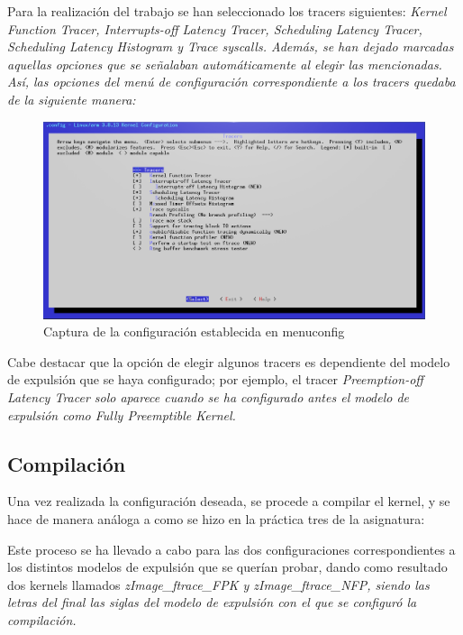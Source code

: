 \documentclass[../main.tex]{subfiles}
\begin{document}
Para la realización del trabajo se han seleccionado los tracers siguientes: \it{Kernel Function Tracer}, \it{Interrupts-off Latency Tracer}, \it{Scheduling Latency Tracer}, \it{Scheduling Latency Histogram} y \it{Trace syscalls}. Además, se han dejado marcadas aquellas opciones que se señalaban automáticamente al elegir las mencionadas. Así, las opciones del menú de configuración correspondiente a los tracers quedaba de la siguiente manera:

\begin{figure}[htp]
    \centering
    \includegraphics[width=15cm]{imagenes/capturas/Linux-make-menuconfig-tracers.png}
    \caption{Captura de la configuración establecida en menuconfig}
\end{figure}

Cabe destacar que la opción de elegir algunos tracers es dependiente del modelo de expulsión que se haya configurado; por ejemplo, el tracer \it{Preemption-off Latency Tracer} solo aparece cuando se ha configurado antes el modelo de expulsión como \it{Fully Preemptible Kernel}.

\subsection{Compilación}

Una vez realizada la configuración deseada, se procede a compilar el kernel, y se hace de manera análoga a como se hizo en la práctica tres de la asignatura:


Este proceso se ha llevado a cabo para las dos configuraciones correspondientes a los distintos modelos de expulsión que se querían probar, dando como resultado dos kernels llamados \it{zImage\_ftrace\_FPK} y \it{zImage\_ftrace\_NFP}, siendo las letras del final las siglas del modelo de expulsión con el que se configuró la compilación.
\end{document}
